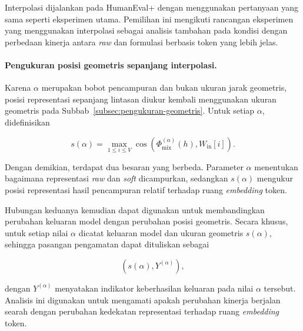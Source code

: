 Interpolasi dijalankan pada HumanEval+ dengan menggunakan pertanyaan yang
sama seperti eksperimen utama. Pemilihan ini mengikuti rancangan eksperimen
yang menggunakan interpolasi sebagai analisis tambahan pada kondisi dengan
perbedaan kinerja antara \textit{raw} dan formulasi berbasis token yang lebih
jelas.

\paragraph{Pengukuran posisi geometris sepanjang interpolasi.}

Karena $\alpha$ merupakan bobot pencampuran dan bukan ukuran jarak geometris,
posisi representasi sepanjang lintasan diukur kembali menggunakan ukuran
geometris pada Subbab~\ref{subsec:pengukuran-geometris}. Untuk setiap
$\alpha$, didefinisikan

\begin{equation}
s(\alpha)
=
\max_{1\leq i\leq V}
\cos
\left(
\Phi_{\mathrm{mix}}^{(\alpha)}(h),
W_{\mathrm{in}}[i]
\right).
\label{eq:m-interp-score}
\end{equation}

Dengan demikian, terdapat dua besaran yang berbeda. Parameter $\alpha$
menentukan bagaimana representasi \textit{raw} dan \textit{soft} dicampurkan,
sedangkan $s(\alpha)$ mengukur posisi representasi hasil pencampuran relatif
terhadap ruang \textit{embedding} token.

Hubungan keduanya kemudian dapat digunakan untuk membandingkan perubahan
keluaran model dengan perubahan posisi geometris. Secara khusus, untuk setiap
nilai $\alpha$ dicatat keluaran model dan ukuran geometris
$s(\alpha)$, sehingga pasangan pengamatan dapat dituliskan sebagai

\begin{equation}
\left(
s(\alpha),Y^{(\alpha)}
\right),
\label{eq:m-interp-observation}
\end{equation}

dengan $Y^{(\alpha)}$ menyatakan indikator keberhasilan keluaran pada nilai
$\alpha$ tersebut. Analisis ini digunakan untuk mengamati apakah perubahan kinerja berjalan
searah dengan perubahan kedekatan representasi terhadap ruang
\textit{embedding} token.

